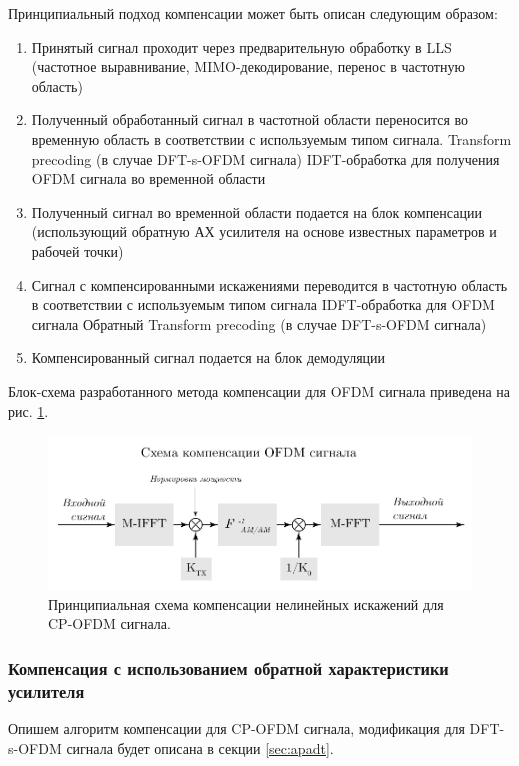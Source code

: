 Принципиальный подход компенсации может быть описан следующим
образом:
\begin{enumerate}
    \item Принятый сигнал проходит через предварительную обработку в LLS
    (частотное выравнивание, MIMO-декодирование, перенос в частотную
    область)
    \item Полученный обработанный сигнал в частотной области переносится во
    временную область в соответствии с используемым типом сигнала.
    \subitem Transform precoding (в случае DFT-s-OFDM сигнала)
    \subitem IDFT-обработка для получения OFDM сигнала во временной области
    \item Полученный сигнал во временной области подается на блок
    компенсации (использующий обратную АХ усилителя на основе известных
    параметров и рабочей точки)
    \item Сигнал с компенсированными искажениями переводится в частотную
    область в соответствии с используемым типом сигнала
    \subitem IDFT-обработка для OFDM сигнала
    \subitem Обратный Transform precoding (в случае DFT-s-OFDM сигнала)
    \item Компенсированный сигнал подается на блок демодуляции
\end{enumerate}

Блок-схема разработанного метода компенсации для OFDM сигнала приведена на
рис. \ref{fig:ofdm_compensation_scheme}.

\begin{figure}[h!]
    \centering
    \includegraphics[width=0.99\linewidth]{figs/ofdm_compensation_scheme.pdf}
    \caption{Принципиальная схема компенсации нелинейных искажений для CP-OFDM сигнала.}
    \label{fig:ofdm_compensation_scheme}
\end{figure}

\subsubsection{Компенсация с использованием обратной характеристики усилителя}
Опишем алгоритм компенсации для CP-OFDM сигнала,
модификация для DFT-s-OFDM сигнала будет описана в секции \ref{sec:apadt}.

